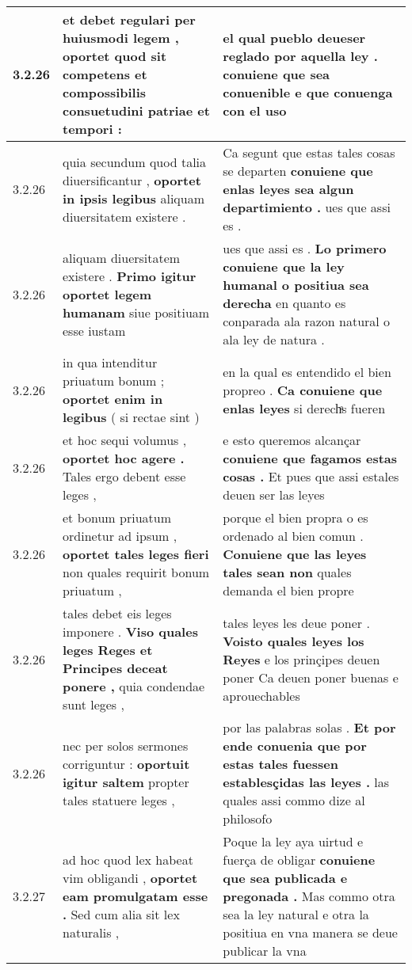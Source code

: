 \begin{tabular}{|p{1cm}|p{6.5cm}|p{6.5cm}|}
3.2.26 & et debet regulari per huiusmodi legem , \textbf{ oportet quod sit competens } et compossibilis consuetudini patriae et tempori : & el qual pueblo deueser reglado por aquella ley . \textbf{ conuiene que sea conuenible } e que conuenga con el uso \\\hline
3.2.26 & quia secundum quod talia diuersificantur , \textbf{ oportet in ipsis legibus } aliquam diuersitatem existere . & Ca segunt que estas tales cosas se departen \textbf{ conuiene que enlas leyes sea algun departimiento . } ues que assi es . \\\hline
3.2.26 & aliquam diuersitatem existere . \textbf{ Primo igitur oportet legem humanam } siue positiuam esse iustam & ues que assi es . \textbf{ Lo primero conuiene que la ley humanal o positiua sea derecha } en quanto es conparada ala razon natural o ala ley de natura . \\\hline
3.2.26 & in qua intenditur priuatum bonum ; \textbf{ oportet enim in legibus } ( si rectae sint ) & en la qual es entendido el bien propreo . \textbf{ Ca conuiene que enlas leyes } si derechͣs fueren \\\hline
3.2.26 & et hoc sequi volumus , \textbf{ oportet hoc agere . } Tales ergo debent esse leges , & e esto queremos alcançar \textbf{ conuiene que fagamos estas cosas . } Et pues que assi estales deuen ser las leyes \\\hline
3.2.26 & et bonum priuatum ordinetur ad ipsum , \textbf{ oportet tales leges fieri } non quales requirit bonum priuatum , & porque el bien propra o es ordenado al bien comun . \textbf{ Conuiene que las leyes tales sean non } quales demanda el bien propre \\\hline
3.2.26 & tales debet eis leges imponere . \textbf{ Viso quales leges Reges et Principes deceat ponere , } quia condendae sunt leges , & tales leyes les deue poner . \textbf{ Voisto quales leyes los Reyes } e los prinçipes deuen poner Ca deuen poner buenas e aprouechables \\\hline
3.2.26 & nec per solos sermones corriguntur : \textbf{ oportuit igitur saltem } propter tales statuere leges , & por las palabras solas . \textbf{ Et por ende conuenia que por estas tales fuessen establesçidas las leyes . } las quales assi commo dize al philosofo \\\hline
3.2.27 & ad hoc quod lex habeat vim obligandi , \textbf{ oportet eam promulgatam esse . } Sed cum alia sit lex naturalis , & Poque la ley aya uirtud e fuerça de obligar \textbf{ conuiene que sea publicada e pregonada . } Mas commo otra sea la ley natural e otra la positiua en vna manera se deue publicar la vna \\\hline

\end{tabular}
